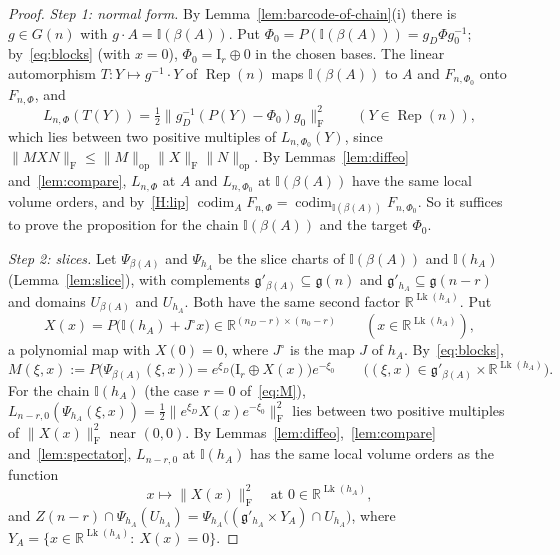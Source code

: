 \documentclass[11pt,a4paper]{article}
\theoremstyle{definition}
\theoremstyle{remark}
\numberwithin{equation}{section}
\newcommand{\R}{\mathbb{R}}
\newcommand{\Rep}{\operatorname{Rep}}
\newcommand{\codim}{\operatorname{codim}}
\newcommand{\id}{\mathrm{I}}
\newcommand{\Fr}[1]{\lVert #1\rVert_{\mathrm F}}
\newcommand{\norm}[1]{\lVert #1\rVert}
\newcommand{\I}{\mathbb I}
\newcommand{\g}{\mathfrak g}
\newcommand{\Lk}{\operatorname{Lk}}
\begin{document}
\begin{proof}
\emph{Step 1: normal form.} By Lemma~\ref{lem:barcode-of-chain}(i) there is $g\in G(n)$ with $g\cdot A=\I(\beta(A))$. Put $\Phi_0=P(\I(\beta(A)))=g_D\Phi g_0^{-1}$; by~\eqref{eq:blocks} (with $x=0$), $\Phi_0=\id_r\oplus0$ in the chosen bases. The linear automorphism $T:Y\mapsto g^{-1}\cdot Y$ of $\Rep(n)$ maps $\I(\beta(A))$ to $A$ and $F_{n,\Phi_0}$ onto $F_{n,\Phi}$, and
\[
L_{n,\Phi}(T(Y))=\tfrac12\Fr{g_D^{-1}(P(Y)-\Phi_0)g_0}^2\qquad(Y\in\Rep(n)),
\]
which lies between two positive multiples of $L_{n,\Phi_0}(Y)$, since $\Fr{MXN}\le\norm M_{\mathrm{op}}\Fr X\norm N_{\mathrm{op}}$. By Lemmas~\ref{lem:diffeo} and~\ref{lem:compare}, $L_{n,\Phi}$ at $A$ and $L_{n,\Phi_0}$ at $\I(\beta(A))$ have the same local volume orders, and by~\ref{H:lip} $\codim_AF_{n,\Phi}=\codim_{\I(\beta(A))}F_{n,\Phi_0}$. So it suffices to prove the proposition for the chain $\I(\beta(A))$ and the target $\Phi_0$.

\emph{Step 2: slices.} Let $\Psi_{\beta(A)}$ and $\Psi_{h_A}$ be the slice charts of $\I(\beta(A))$ and $\I(h_A)$ (Lemma~\ref{lem:slice}), with complements $\g'_{\beta(A)}\subseteq\g(n)$ and $\g'_{h_A}\subseteq\g(n-r)$ and domains $U_{\beta(A)}$ and $U_{h_A}$. Both have the same second factor $\R^{\Lk(h_A)}$. Put
\[
X(x)=P\bigl(\I(h_A)+J^\circ x\bigr)\in\R^{(n_D-r)\times(n_0-r)}\qquad(x\in\R^{\Lk(h_A)}),
\]
a polynomial map with $X(0)=0$, where $J^\circ$ is the map $J$ of $h_A$. By~\eqref{eq:blocks},
\begin{equation}\label{eq:M}
M(\xi,x):=P\bigl(\Psi_{\beta(A)}(\xi,x)\bigr)=e^{\xi_D}\bigl(\id_r\oplus X(x)\bigr)e^{-\xi_0}\qquad\bigl((\xi,x)\in\g'_{\beta(A)}\times\R^{\Lk(h_A)}\bigr).
\end{equation}
For the chain $\I(h_A)$ (the case $r=0$ of~\eqref{eq:M}), $L_{n-r,0}(\Psi_{h_A}(\xi,x))=\frac{1}{2}\Fr{e^{\xi_D}X(x)e^{-\xi_0}}^2$ lies between two positive multiples of $\Fr{X(x)}^2$ near $(0,0)$. By Lemmas~\ref{lem:diffeo},~\ref{lem:compare} and~\ref{lem:spectator}, $L_{n-r,0}$ at $\I(h_A)$ has the same local volume orders as the function
\[
x\mapsto\Fr{X(x)}^2\quad\text{at }0\in\R^{\Lk(h_A)},
\]
and $Z(n-r)\cap\Psi_{h_A}(U_{h_A})=\Psi_{h_A}\bigl((\g'_{h_A}\times Y_A)\cap U_{h_A}\bigr)$, where $Y_A=\{x\in\R^{\Lk(h_A)}:\ X(x)=0\}$.


\end{proof}
\end{document}
